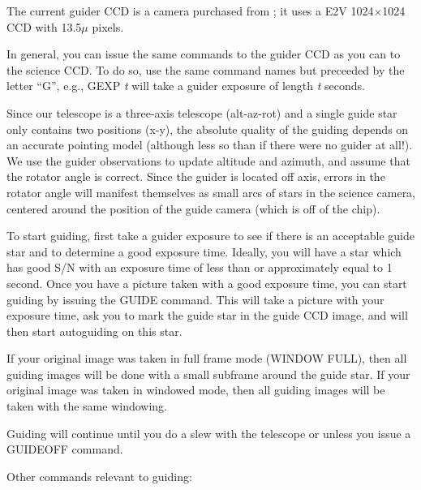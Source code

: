 \documentclass[10pt]{report}
\begin{document}
The current guider CCD is a camera purchased from 
; it
uses a E2V 1024$\times$1024 CCD with 13.5$\mu$ pixels.

In general, you can issue the same commands to the guider CCD as you
can to the science CCD. To do so, use the same command names but preceeded
by the letter ``G'', e.g., GEXP \textit{t} will take a guider exposure
of length \textit{t} seconds.

Since our telescope is a three-axis telescope (alt-az-rot) and a single
guide star only contains two positions (x-y), the absolute quality of 
the guiding depends on an accurate pointing model (although less so than
if there were no guider at all!). We use the guider observations to
update altitude and azimuth, and assume that the rotator angle is correct.
Since the guider is located off axis, errors in the rotator angle will
manifest themselves as small arcs of stars in the science camera, centered
around the position of the guide camera (which is off of the chip). 


To start guiding, first take a guider exposure to see if there is an
acceptable guide star and to determine a good exposure time. Ideally, you
will have a star which has good S/N with an exposure time of less than
or approximately equal to 1 second. Once you have a picture taken with
a good exposure time, you can start guiding by issuing the GUIDE command.
This will take a picture with your exposure time, ask you to mark the
guide star in the guide CCD image, and will then start autoguiding on
this star. 

If your original image was taken in full frame mode (WINDOW FULL), then
all guiding images will be done with a small subframe around the
guide star. If your original image was taken in windowed mode, then
all guiding images will be taken with the same windowing.

Guiding will continue until you do a slew with the telescope or unless
you issue a GUIDEOFF command.

Other commands relevant to guiding:
\end{document}
